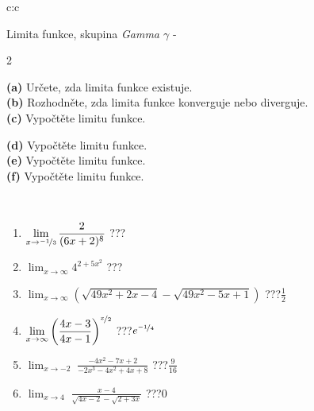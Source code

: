 \documentclass[10pt]{report}
\begin{document}
\begin{tabular}{c:c}
\begin{minipage}[c][104.5mm][t]{0.5\linewidth}
\begin{center}
\vspace{7mm}
{\huge Limita funkce, skupina \textit{Gamma $\gamma$} -}\\[5mm]
\begin{minipage}{0.95\linewidth}
\begin{center}
{\small \begin{multicols}{2} \raggedright
\textbf{(a)} Určete, zda limita funkce existuje. \\[1mm]
\textbf{(b)} Rozhodněte, zda limita funkce konverguje nebo diverguje. \\[1mm]
\textbf{(c)} Vypočtěte limitu funkce. \par \columnbreak
\textbf{(d)} Vypočtěte limitu funkce. \\[1mm]
\textbf{(e)} Vypočtěte limitu funkce. \\[1mm]
\textbf{(f)} Vypočtěte limitu funkce. \\[1mm]
\end{multicols}
}
\end{center}
\end{minipage}
\\[4mm]
\begin{minipage}{0.79\linewidth}
\begin{center}
\begin{varwidth}{\linewidth}
\begin{enumerate}
\normalsize
\item $\displaystyle\lim_{x\to\nicefrac{-1}{3}}{\frac{2}{(6x+2)^{8}}}$\quad \dotfill\; ???\;\dotfill \quad {}
\item $\displaystyle\lim_{x\to\infty}{4^{2+5x^2}}$\quad \dotfill\; ???\;\dotfill \quad {}
\item $\displaystyle\lim_{x\to\infty}{\left(\sqrt{49x^2+2x-4} - \sqrt{49x^2-5x+1}\right)}$\quad \dotfill\; ???\;\dotfill \quad $\frac{1}{2}$
\item $\displaystyle\lim_{x\to\infty}{\left( \frac{4x-3}{4x-1} \right)^{\nicefrac{x}{2}}}$\quad \dotfill\; ???\;\dotfill \quad $e^{\nicefrac{-1}{4}}$
\item $\displaystyle\lim_{x\to -2}{\;\frac{-4x^2-7x+2}{-2x^3-4x^2+4x+8}}$\quad \dotfill\; ???\;\dotfill \quad $\frac{9}{16}$
\item $\displaystyle\lim_{x\to 4}{\;\frac{x-4}{\sqrt{4x-2} - \sqrt{2+3x}}}$\quad \dotfill\; ???\;\dotfill \quad $0$

\end{enumerate}
\end{varwidth}
\end{center}
\end{minipage}
\end{center}
\end{minipage}
\end{tabular}
\end{document}
